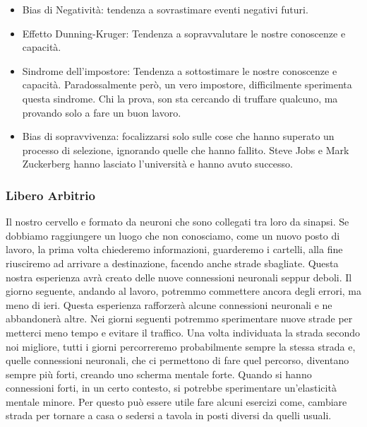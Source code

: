 \documentclass[12pt]{book} %
\begin{document}
\begin{itemize}
\item Bias di Negatività: tendenza a sovrastimare eventi negativi futuri.
\item Effetto Dunning-Kruger: Tendenza a sopravvalutare le nostre conoscenze e capacità. 
\item Sindrome dell'impostore: Tendenza a sottostimare le nostre conoscenze e capacità. Paradossalmente però, un vero impostore, difficilmente sperimenta questa sindrome. Chi la prova, son sta cercando di truffare qualcuno, ma provando solo a fare un buon lavoro.
\item Bias di sopravvivenza: focalizzarsi solo sulle cose che hanno superato un processo di selezione, ignorando quelle che hanno fallito. Steve Jobs e Mark Zuckerberg hanno lasciato l'università e hanno avuto successo.
\end{itemize}

\subsubsection{Libero Arbitrio}
Il nostro cervello e formato da neuroni che sono collegati tra loro da sinapsi. Se dobbiamo raggiungere un luogo che non conosciamo, come un nuovo posto di lavoro, la prima volta chiederemo informazioni, guarderemo i cartelli, alla fine riusciremo ad arrivare a destinazione, facendo anche strade sbagliate. 
Questa nostra esperienza avrà creato delle nuove connessioni neuronali seppur deboli. Il giorno seguente, andando al lavoro, potremmo commettere ancora degli errori, ma meno di ieri. Questa esperienza rafforzerà alcune connessioni neuronali e ne abbandonerà altre. Nei giorni seguenti potremmo sperimentare nuove strade per metterci meno tempo e evitare il traffico. Una volta individuata la strada secondo noi migliore, tutti i giorni percorreremo probabilmente sempre la stessa strada e, quelle connessioni neuronali, che ci permettono di fare quel percorso, diventano sempre più forti, creando uno scherma mentale forte. Quando si hanno connessioni forti, in un certo contesto, si potrebbe sperimentare un'elasticità mentale minore. Per questo può essere utile fare alcuni esercizi come, cambiare strada per tornare a casa o sedersi a tavola in posti diversi da quelli usuali.
\end{document}
